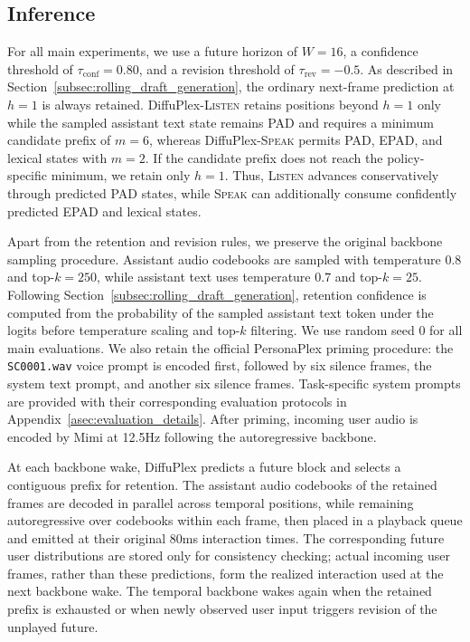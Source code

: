 \subsection{Inference}
\label{asubsec:inference}

For all main experiments, we use a future horizon of $W=16$, a confidence threshold of $\tau_{\mathrm{conf}}=0.80$, and a revision threshold of $\tau_{\mathrm{rev}}=-0.5$.
As described in Section~\ref{subsec:rolling_draft_generation}, the ordinary next-frame prediction at $h=1$ is always retained.
DiffuPlex-\textsc{Listen} retains positions beyond $h=1$ only while the sampled assistant text state remains PAD and requires a minimum candidate prefix of $m=6$, whereas DiffuPlex-\textsc{Speak} permits PAD, EPAD, and lexical states with $m=2$.
If the candidate prefix does not reach the policy-specific minimum, we retain only $h=1$.
Thus, \textsc{Listen} advances conservatively through predicted PAD states, while \textsc{Speak} can additionally consume confidently predicted EPAD and lexical states.

Apart from the retention and revision rules, we preserve the original backbone sampling procedure.
Assistant audio codebooks are sampled with temperature $0.8$ and top-$k=250$, while assistant text uses temperature $0.7$ and top-$k=25$.
Following Section~\ref{subsec:rolling_draft_generation}, retention confidence is computed from the probability of the sampled assistant text token under the logits before temperature scaling and top-$k$ filtering.
We use random seed 0 for all main evaluations.
We also retain the official PersonaPlex priming procedure: the \texttt{SC0001.wav} voice prompt is encoded first, followed by six silence frames, the system text prompt, and another six silence frames.
Task-specific system prompts are provided with their corresponding evaluation protocols in Appendix~\ref{asec:evaluation_details}.
After priming, incoming user audio is encoded by Mimi at 12.5Hz following the autoregressive backbone.

At each backbone wake, DiffuPlex predicts a future block and selects a contiguous prefix for retention.
The assistant audio codebooks of the retained frames are decoded in parallel across temporal positions, while remaining autoregressive over codebooks within each frame, then placed in a playback queue and emitted at their original 80ms interaction times.
The corresponding future user distributions are stored only for consistency checking; actual incoming user frames, rather than these predictions, form the realized interaction used at the next backbone wake.
The temporal backbone wakes again when the retained prefix is exhausted or when newly observed user input triggers revision of the unplayed future.

